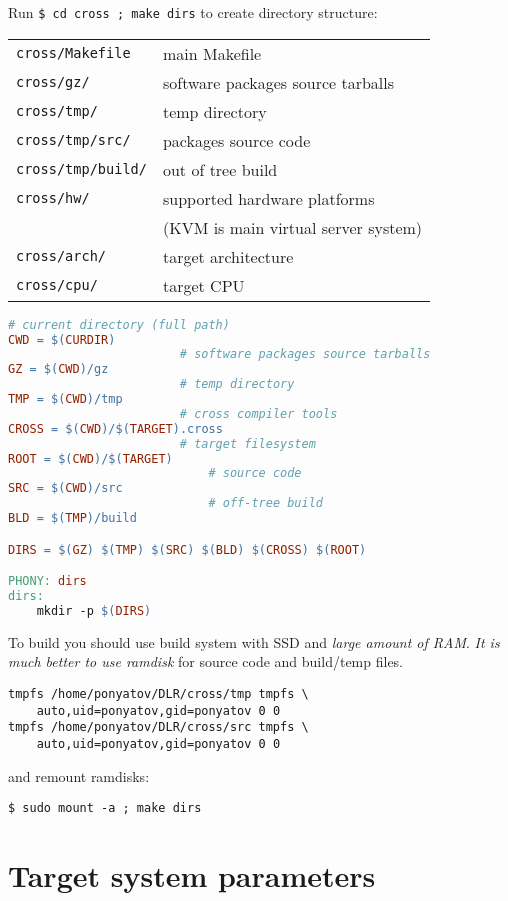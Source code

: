 Run \verb|$ cd cross ; make dirs| to create directory structure:

\bigskip
\begin{tabular}{l l}
\verb|cross/Makefile| & main Makefile \\
\verb|cross/gz/| & software packages source tarballs \\
\verb|cross/tmp/| & temp directory \\
\verb|cross/tmp/src/| & packages source code \\
\verb|cross/tmp/build/| & out of tree build \\
\verb|cross/hw/| & supported hardware platforms\\
				&(KVM is main virtual server system)\\
\verb|cross/arch/| & target architecture\\
\verb|cross/cpu/| & target CPU\\
\end{tabular}

\clearpage

\begin{lstlisting}[language=make]
						# current directory (full path)
CWD = $(CURDIR)
						# software packages source tarballs
GZ = $(CWD)/gz
						# temp directory
TMP = $(CWD)/tmp
						# cross compiler tools						
CROSS = $(CWD)/$(TARGET).cross
						# target filesystem
ROOT = $(CWD)/$(TARGET)
							# source code
SRC = $(CWD)/src
							# off-tree build
BLD = $(TMP)/build

DIRS = $(GZ) $(TMP) $(SRC) $(BLD) $(CROSS) $(ROOT)

PHONY: dirs
dirs:
	mkdir -p $(DIRS)
\end{lstlisting}

To build you should use build system with SSD and \emph{large amount of RAM}.
\emph{It is much better to use ramdisk} for source code and build/temp files.

\begin{lstlisting}[title=add this to /etc/fstab (change to your home/gid/uid)]
tmpfs /home/ponyatov/DLR/cross/tmp tmpfs \
	auto,uid=ponyatov,gid=ponyatov 0 0
tmpfs /home/ponyatov/DLR/cross/src tmpfs \
	auto,uid=ponyatov,gid=ponyatov 0 0
\end{lstlisting}
and remount ramdisks:
\begin{lstlisting}
$ sudo mount -a ; make dirs
\end{lstlisting}

\clearpage
\section{Target system parameters}

